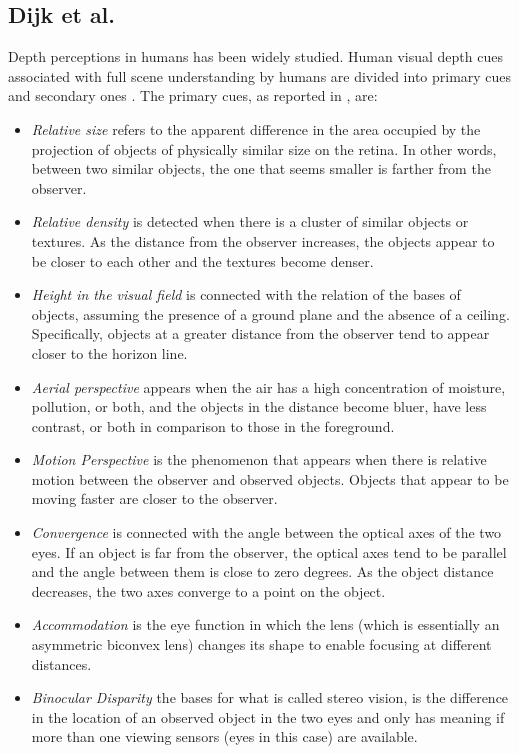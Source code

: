 \subsection{Dijk et al.}
Depth perceptions in humans has been widely studied.
Human visual depth cues associated with full scene understanding by humans are divided into primary cues and secondary ones \cite{monocular2024}.
The primary cues, as reported in \cite{monocular2024}, are:
\begin{itemize}
    \item{
        \textit{Relative size} refers to the apparent difference in the area occupied by the projection of objects of physically similar size on the retina.
        In other words, between two similar objects, the one that seems smaller is farther from the observer.
    }
    \item{
        \textit{Relative density} is detected when there is a cluster of similar objects or textures.
        As the distance from the observer increases, the objects appear to be closer to each other and the textures become denser.
    }
    \item{
        \textit{Height in the visual field} is connected with the relation of the bases of objects, assuming the presence of a ground plane and the absence of a ceiling.
        Specifically, objects at a greater distance from the observer tend to appear closer to the horizon line.
    }
    \item{
        \textit{Aerial perspective}  appears when the air has a high concentration of moisture, pollution, or both, and the objects in the distance become bluer, have less contrast, or both in comparison to those in the foreground.
    }
    \item{
        \textit{Motion Perspective} is the phenomenon that appears when there is relative motion between the observer and observed objects.
        Objects that appear to be moving faster are closer to the observer.
    }
    \item{
        \textit{Convergence} is connected with the angle between the optical axes of the two eyes.
        If an object is far from the observer, the optical axes tend to be parallel and the angle between them is close to zero degrees.
        As the object distance decreases, the two axes converge to a point on the object.
    }
    \item{
        \textit{Accommodation} is the eye function in which the lens (which is essentially an asymmetric biconvex lens) changes its shape to enable focusing at different distances.
    }
    \item{
        \textit{Binocular Disparity} the bases for what is called stereo vision, is the difference in the location of an observed object in the two eyes and only has meaning if more than one viewing sensors (eyes in this case) are available.
    }
\end{itemize}
